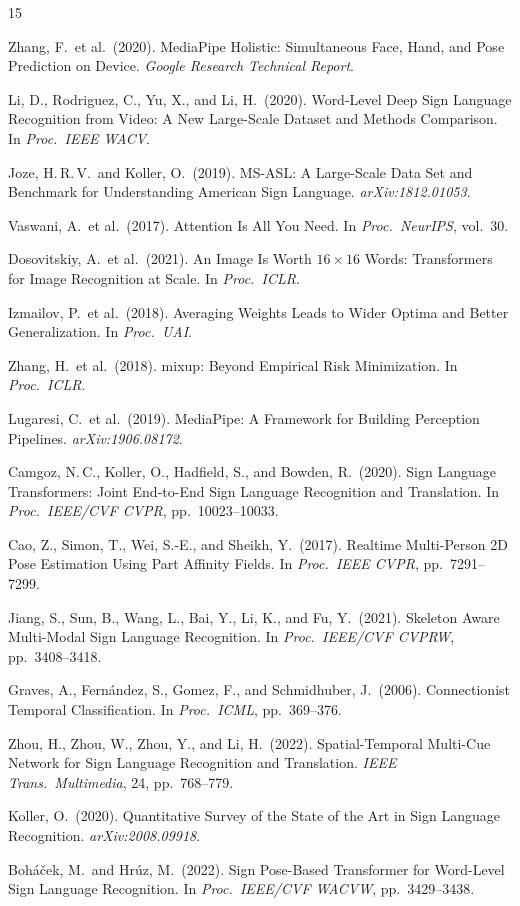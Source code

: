 \documentclass[10pt, twocolumn]{article}
\begin{document}
\onecolumn
\newpage
\begin{thebibliography}{15}

Zhang, F.\ et al.\ (2020). MediaPipe Holistic: Simultaneous Face, Hand, and Pose Prediction on Device. \textit{Google Research Technical Report}.

Li, D., Rodriguez, C., Yu, X., and Li, H.\ (2020). Word-Level Deep Sign Language Recognition from Video: A New Large-Scale Dataset and Methods Comparison. In \textit{Proc.\ IEEE WACV}.

Joze, H.\,R.\,V.\ and Koller, O.\ (2019). MS-ASL: A Large-Scale Data Set and Benchmark for Understanding American Sign Language. \textit{arXiv:1812.01053}.

Vaswani, A.\ et al.\ (2017). Attention Is All You Need. In \textit{Proc.\ NeurIPS}, vol.~30.

Dosovitskiy, A.\ et al.\ (2021). An Image Is Worth $16{\times}16$ Words: Transformers for Image Recognition at Scale. In \textit{Proc.\ ICLR}.

Izmailov, P.\ et al.\ (2018). Averaging Weights Leads to Wider Optima and Better Generalization. In \textit{Proc.\ UAI}.

Zhang, H.\ et al.\ (2018). mixup: Beyond Empirical Risk Minimization. In \textit{Proc.\ ICLR}.

Lugaresi, C.\ et al.\ (2019). MediaPipe: A Framework for Building Perception Pipelines. \textit{arXiv:1906.08172}.

Camgoz, N.\,C., Koller, O., Hadfield, S., and Bowden, R.\ (2020). Sign Language Transformers: Joint End-to-End Sign Language Recognition and Translation. In \textit{Proc.\ IEEE/CVF CVPR}, pp.~10023--10033.

Cao, Z., Simon, T., Wei, S.-E., and Sheikh, Y.\ (2017). Realtime Multi-Person 2D Pose Estimation Using Part Affinity Fields. In \textit{Proc.\ IEEE CVPR}, pp.~7291--7299.

Jiang, S., Sun, B., Wang, L., Bai, Y., Li, K., and Fu, Y.\ (2021). Skeleton Aware Multi-Modal Sign Language Recognition. In \textit{Proc.\ IEEE/CVF CVPRW}, pp.~3408--3418.

Graves, A., Fern\'{a}ndez, S., Gomez, F., and Schmidhuber, J.\ (2006). Connectionist Temporal Classification. In \textit{Proc.\ ICML}, pp.~369--376.

Zhou, H., Zhou, W., Zhou, Y., and Li, H.\ (2022). Spatial-Temporal Multi-Cue Network for Sign Language Recognition and Translation. \textit{IEEE Trans.\ Multimedia}, 24, pp.~768--779.

Koller, O.\ (2020). Quantitative Survey of the State of the Art in Sign Language Recognition. \textit{arXiv:2008.09918}.

Boh\'{a}\v{c}ek, M.\ and Hr\'{u}z, M.\ (2022). Sign Pose-Based Transformer for Word-Level Sign Language Recognition. In \textit{Proc.\ IEEE/CVF WACVW}, pp.~3429--3438.

\end{thebibliography}
\end{document}
